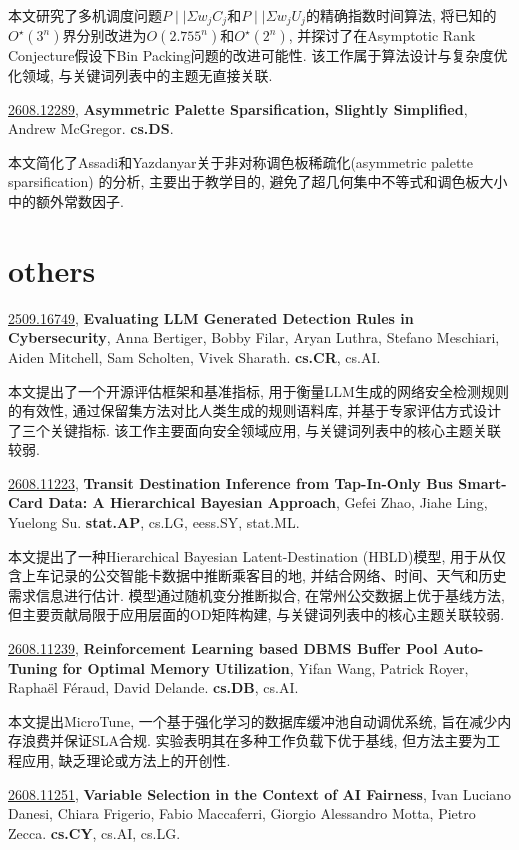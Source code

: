 \documentclass[9pt, a4paper]{article}
\theoremstyle{plain}
\theoremstyle{definition}
\theoremstyle{remark}
\newcommand{\arxivwithtarget}[3]{\hypertarget{#1}{}\href{https://arxiv.org/abs/#1}{#1}, \textbf{\textcolor{arxivblue}{#2}}, #3. }
\begin{document}
本文研究了多机调度问题$P \mid \mid \Sigma w_j C_j$和$P \mid \mid \Sigma w_j U_j$的精确指数时间算法, 将已知的${O}^{\star}(3^n)$界分别改进为${O}(2.755^n)$和${O}^{\star}(2^n)$, 并探讨了在Asymptotic Rank Conjecture假设下Bin Packing问题的改进可能性. 该工作属于算法设计与复杂度优化领域, 与关键词列表中的主题无直接关联.


\arxivwithtarget{2608.12289}{Asymmetric Palette Sparsification, Slightly Simplified}{Andrew McGregor}\textbf{cs.DS}.

本文简化了Assadi和Yazdanyar关于非对称调色板稀疏化(asymmetric palette sparsification) 的分析, 主要出于教学目的, 避免了超几何集中不等式和调色板大小中的额外常数因子.


\section{others}
\arxivwithtarget{2509.16749}{Evaluating LLM Generated Detection Rules in Cybersecurity}{Anna Bertiger, Bobby Filar, Aryan Luthra, Stefano Meschiari, Aiden Mitchell, Sam Scholten, Vivek Sharath}\textbf{cs.CR}, cs.AI.

本文提出了一个开源评估框架和基准指标, 用于衡量LLM生成的网络安全检测规则的有效性, 通过保留集方法对比人类生成的规则语料库, 并基于专家评估方式设计了三个关键指标. 该工作主要面向安全领域应用, 与关键词列表中的核心主题关联较弱.


\arxivwithtarget{2608.11223}{Transit Destination Inference from Tap-In-Only Bus Smart-Card Data: A Hierarchical Bayesian Approach}{Gefei Zhao, Jiahe Ling, Yuelong Su}\textbf{stat.AP}, cs.LG, eess.SY, stat.ML.

本文提出了一种Hierarchical Bayesian Latent-Destination (HBLD)模型, 用于从仅含上车记录的公交智能卡数据中推断乘客目的地, 并结合网络、时间、天气和历史需求信息进行估计. 模型通过随机变分推断拟合, 在常州公交数据上优于基线方法, 但主要贡献局限于应用层面的OD矩阵构建, 与关键词列表中的核心主题关联较弱.


\arxivwithtarget{2608.11239}{Reinforcement Learning based DBMS Buffer Pool Auto-Tuning for Optimal Memory Utilization}{Yifan Wang, Patrick Royer, Raphaël Féraud, David Delande}\textbf{cs.DB}, cs.AI.

本文提出MicroTune, 一个基于强化学习的数据库缓冲池自动调优系统, 旨在减少内存浪费并保证SLA合规. 实验表明其在多种工作负载下优于基线, 但方法主要为工程应用, 缺乏理论或方法上的开创性.


\arxivwithtarget{2608.11251}{Variable Selection in the Context of AI Fairness}{Ivan Luciano Danesi, Chiara Frigerio, Fabio Maccaferri, Giorgio Alessandro Motta, Pietro Zecca}\textbf{cs.CY}, cs.AI, cs.LG.
\end{document}
